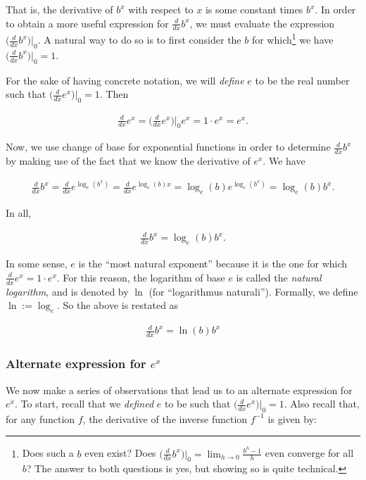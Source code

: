 That is, the derivative of $b^x$ with respect to $x$ is some constant times $b^x$. In order to obtain a more useful expression for $\frac{d}{dx} b^x$, we must evaluate the expression $\Big( \frac{d}{dx} b^x \Big)\Big|_0$. A natural way to do so is to first consider the $b$ for which\footnote{Does such a $b$ even exist? Does $\Big( \frac{d}{dx} b^x \Big)\Big|_0 = \lim_{h \rightarrow 0} \frac{b^h - 1}{h}$ even converge for all $b$? The answer to both questions is yes, but showing so is quite technical.} we have $\Big( \frac{d}{dx} b^x \Big)\Big|_0 = 1$.

For the sake of having concrete notation, we will \textit{define} $e$ to be the real number such that $\Big( \frac{d}{dx} e^x \Big)\Big|_0 = 1$. Then

\begin{align*}
    \frac{d}{dx} e^x = \Big( \frac{d}{dx} e^x \Big)\Big|_0 e^x = 1 \cdot e^x = e^x.
\end{align*}

Now, we use change of base for exponential functions in order to determine $\frac{d}{dx} b^x$ by making use of the fact that we know the derivative of $e^x$. We have

\begin{align*}
    \frac{d}{dx} b^x = \frac{d}{dx} e^{\log_e(b^x)} = \frac{d}{dx} e^{\log_e(b) x} = \log_e(b) e^{\log_e(b^x)} = \log_e(b) b^x.
\end{align*}

In all,

\begin{align*}
    \frac{d}{dx} b^x = \log_e(b) b^x.
\end{align*}

In some sense, $e$ is the ``most natural exponent'' because it is the one for which $\frac{d}{dx} e^x = 1 \cdot e^x$. For this reason, the logarithm of base $e$ is called the \textit{natural logarithm}, and is denoted by $\ln$ (for ``logarithmus naturali''). Formally, we define $\ln := \log_e$. So the above is restated as

\begin{align*}
    \boxed
    {
        \frac{d}{dx} b^x = \ln(b) b^x
    }
\end{align*}

\subsubsection*{Alternate expression for $e^x$}

We now make a series of observations that lead us to an alternate expression for $e^x$. To start, recall that we \textit{defined} $e$ to be such that $\Big( \frac{d}{dx} e^x \Big)\Big|_0 = 1$. Also recall that, for any function $f$, the derivative of the inverse function $f^{-1}$ is given by:

